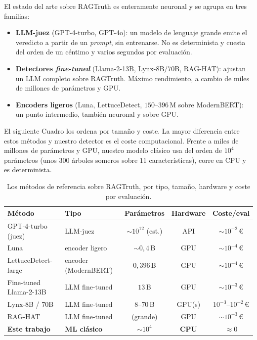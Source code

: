 \documentclass[12pt,a4paper]{report}
\theoremstyle{definition}
\begin{document}
El estado del arte sobre RAGTruth es enteramente neuronal y se agrupa en tres familias:
\begin{itemize}
  \item \textbf{LLM-juez} (GPT-4-turbo, GPT-4o): un modelo de lenguaje grande emite el veredicto
  a partir de un \emph{prompt}, sin entrenarse. No es determinista y cuesta del orden de un
  céntimo y varios segundos por evaluación.
  \item \textbf{Detectores \emph{fine-tuned}} (Llama-2-13B, Lynx-8B/70B, RAG-HAT): ajustan un LLM
  completo sobre RAGTruth. Máximo rendimiento, a cambio de miles de millones de parámetros y GPU.
  \item \textbf{Encoders ligeros} (Luna, LettuceDetect, $150$--$396$\,M sobre ModernBERT): un
  punto intermedio, también neuronal y sobre GPU.
\end{itemize}

El siguiente Cuadro los ordena por tamaño y coste. La mayor diferencia entre estos métodos y nuestro detector es el coste computacional. Frente a miles de millones de parámetros y GPU, nuestro modelo clásico usa del orden de $10^{4}$ parámetros (unos $300$ árboles someros sobre $11$ características), corre en CPU y es determinista.

\begin{table}[H]
\centering
\small
\begin{tabular}{lp{2.7cm}ccc}
\toprule
Método & Tipo & Parámetros & Hardware & Coste/eval \\
\midrule
GPT-4-turbo (juez) & LLM-juez & ${\sim}10^{12}$ (est.) & API & ${\sim}10^{-2}$\,\euro \\
Luna & encoder ligero & ${\sim}0{,}4$\,B & GPU & ${\sim}10^{-4}$\,\euro \\
LettuceDetect-large & encoder (ModernBERT) & $0{,}396$\,B & GPU & ${\sim}10^{-4}$\,\euro \\
Fine-tuned Llama-2-13B & LLM fine-tuned & $13$\,B & GPU & ${\sim}10^{-3}$\,\euro \\
Lynx-8B / 70B & LLM fine-tuned & $8$--$70$\,B & GPU(s) & $10^{-3}$--$10^{-2}$\,\euro \\
RAG-HAT & LLM fine-tuned & (grande) & GPU & ${\sim}10^{-3}$\,\euro \\
\midrule
\textbf{Este trabajo} & \textbf{ML clásico} & $\sim\!10^{4}$ & \textbf{CPU} & \textbf{$\approx 0$} \\
\bottomrule
\end{tabular}
\caption{Los métodos de referencia sobre RAGTruth, por tipo, tamaño, hardware y coste por
evaluación.}
\label{tab:sota-def}
\end{table}
\end{document}
